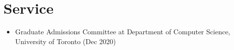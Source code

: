 \section*{Service}
\vspace{\postsubhead}
\begin{adjustwidth}{\indentleft}{\indentright}
  \begin{itemize}
    
    \item Graduate Admissions Committee at Department of Computer Science, University of Toronto (Dec 2020)
    
  \end{itemize}
\end{adjustwidth}
